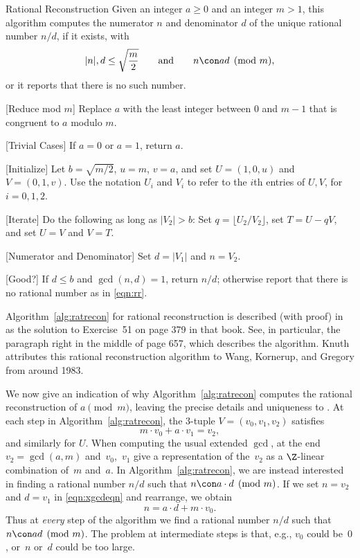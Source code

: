 \begin{algorithm}{Rational Reconstruction}\label{alg:ratrecon}%
  Given an integer $a\geq 0$ and an integer $m> 1$, this algorithm
  computes the numerator $n$ and denominator $d$ of the unique
  rational number $n/d$, if it exists, with
\begin{equation}\label{eqn:rr}
  |n|, d \leq \sqrt{\frac{m}{2}}
\qquad\text{and}\qquad n \con a d \pmod{m},
\end{equation}
or it reports that there is no such number.
\begin{steps}
\item{}[Reduce mod $m$] Replace $a$ with the least integer between $0$
  and $m-1$ that is congruent to $a$ modulo $m$.
\item{} [Trivial Cases] If $a=0$ or $a=1$, return $a$.
\item{} [Initialize] Let $b=\sqrt{m/2}$, $u=m$, $v=a$, and set
   $U=(1,0,u)$ and $V=(0,1,v)$.  Use the notation $U_i$ and $V_i$
to refer to the $i$th entries of $U, V$, for $i=0,1,2$.
\item{} [Iterate] Do the following as long as $|V_2|>b$:
Set $q = \lfloor U_2 / V_2 \rfloor$, 
set $T = U - q V$, and set $U=V$ and $V=T$.
\item{} [Numerator and Denominator] Set $d=|V_1|$ and $n=V_2$.
\item{} [Good?] If $d\leq b$ and $\gcd(n,d)=1$, return $n/d$;
otherwise report that there is no rational number as 
in \eqref{eqn:rr}.
\end{steps}
\end{algorithm}


Algorithm~\ref{alg:ratrecon} for rational reconstruction is described
(with proof) in \cite[pgs. 656--657]{knuth2} as
the solution to Exercise~51 on page 379 in that book.  See, in particular, the
paragraph right in the middle of page 657, which describes the
algorithm.  Knuth attributes this rational reconstruction algorithm to Wang, Kornerup, and Gregory from around 1983.

We now give an indication of why Algorithm~\ref{alg:ratrecon} computes
the rational reconstruction of $a \pmod{m}$, leaving the precise
details and uniqueness to \cite[pgs. 656--657]{knuth2}.  At each
step in Algorithm~\ref{alg:ratrecon}, the $3$-tuple $V=(v_0, v_1,
v_2)$ satisfies
\begin{equation}\label{eqn:xgcdeqn}
   m \cdot v_0 + a\cdot v_1 = v_2,
 \end{equation}
and similarly for $U$.
When computing the usual extended $\gcd$, at the end $v_2=\gcd(a,m)$
and~$v_0$,~$v_1$ give a representation of the~$v_2$ as a $\Z$-linear
combination of~$m$ and~$a$.
In Algorithm~\ref{alg:ratrecon}, we are instead interested
in finding a rational number $n/d$ such that 
$n \con a\cdot d\pmod{m}$.  If we set $n=v_2$ and $d=v_1$
in \eqref{eqn:xgcdeqn} and rearrange, we obtain
$$
  n  = a \cdot d + m \cdot v_0.
$$
Thus at {\em every} step of the algorithm we find a rational number
$n/d$ such that $n\con ad\pmod{m}$.  The problem at intermediate
steps is that, e.g., $v_0$ could be~$0$, or~$n$ or~$d$
could be too large.  



